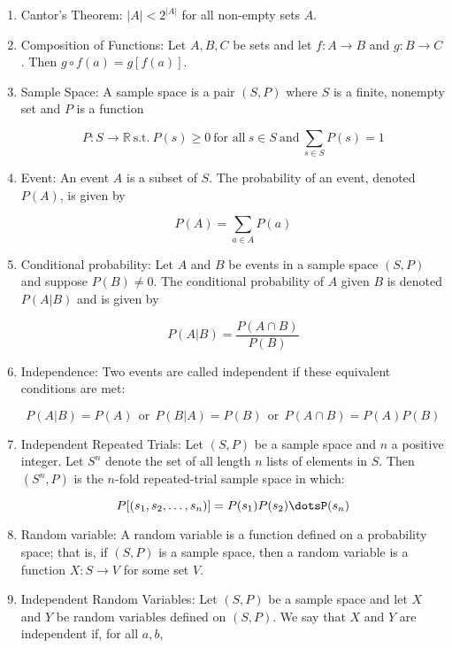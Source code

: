 \documentclass{article}
\begin{document}
\begin{enumerate}
		\item Cantor's Theorem: $|A|<2^{|A|}$ for all non-empty sets $A$.
		
		\item Composition of Functions: Let $A,B,C$ be sets and let $f:A\to B$ and $g:B\to C$.
		Then $g\circ f(a)=g[f(a)]$.
		
		\item Sample Space: A sample space is a pair $(S,P)$ where $S$ is a finite, nonempty set and $P$ is a function
		
		\[P:S\to\mathbb{R}\: \text{s.t.}\: P(s)\geq 0 \: \text{for all}\: s\in S \:\text{and}\: \sum_{s\in S}P(s)=1\]
		
		\item Event: An event $A$ is a subset of $S$.
		The probability of an event, denoted $P(A)$, is given by
		
		\[P(A)=\sum_{a\in A}P(a)\]
		
		\item Conditional probability: Let $A$ and $B$ be events in a sample space $(S,P)$ and suppose $P(B)\neq 0$.
		The conditional probability of $A$ given $B$ is denoted $P(A|B)$ and is given by
		
		\[P(A|B)=\frac{P(A\cap B)}{P(B)}\]
		
		\item Independence: Two events are called independent if these equivalent conditions are met:
		
		\[P(A|B)=P(A)\:\: \text{or} \:\: P(B|A)=P(B) \:\: \text{or} \:\: P(A\cap B)=P(A)P(B)\]
		
		\item Independent Repeated Trials: Let $(S,P)$ be a sample space and $n$ a positive integer.
		Let $S^n$ denote the set of all length $n$ lists of elements in $S$.
		Then $(S^n,P)$ is the $n$-fold repeated-trial sample space in which:
		
		\[P[(s_1,s_2,\dots,s_n)]=P(s_1)P(s_2)\dotsP(s_n)\]
		
		\item Random variable: A random variable is a function defined on a probability space;
		that is, if $(S,P)$ is a sample space, then a random variable is a function $X:S\to V$ for some set $V$.
		
		\item Independent Random Variables: Let $(S,P)$ be a sample space and let $X$ and $Y$ be random variables defined on $(S,P)$.
		We say that $X$ and $Y$ are independent if, for all $a,b$,
		

\end{enumerate}
\end{document}
